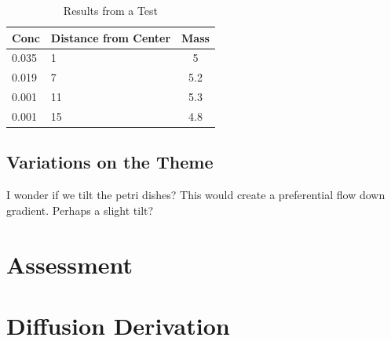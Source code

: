 \documentclass{tufte-handout}
\begin{document}
\begin{table}
	\begin{tabular}{llc} \hline
Conc		&		Distance from Center	&	Mass \\ \hline\hline
0.035		& 	1				& 5		\\
0.019		&		7				& 5.2 \\
0.001		& 	11			&	5.3	\\
0.001	  & 	15			&	4.8	\\ \hline
	\end{tabular}
	\caption{Results from a Test}
	\label{tab:ResultsFromATest}
\end{table}

\subsection{Variations on the Theme}

I wonder if we tilt the petri dishes?  This would create a preferential flow down gradient. Perhaps a slight tilt?





\section{Assessment}


\section{Diffusion Derivation}
\end{document}
